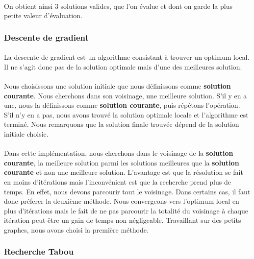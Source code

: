 \documentclass[12pt]{article}
\begin{document}
\paragraph{}On obtient ainsi 3 solutions valides, que l'on évalue et dont on garde la plus petite valeur d'évaluation.

\subsubsection{Descente de gradient}

\paragraph{}La descente de gradient est un algorithme consistant à trouver un optimum local.
Il ne s'agit donc pas de la solution optimale mais d'une des meilleures solution.

\paragraph{}Nous choisissons une solution initiale que nous définissons comme \textbf{solution courante}. Nous cherchons dans son voisinage, une meilleure solution.
S'il y en a une, nous la définissons comme \textbf{solution courante}, puis répétons l'opération.
S'il n'y en a pas, nous avons trouvé la solution optimale locale et l'algorithme est terminé.
Nous remarquons que la solution finale trouvée dépend de la solution initiale choisie.


\paragraph{}Dans cette implémentation, nous cherchons dans le voisinage de la \textbf{solution courante}, la meilleure solution parmi les solutions meilleures que la \textbf{solution courante} et non une meilleure solution.
L'avantage est que la résolution se fait en moins d'itérations mais l'inconvénient est que la recherche prend plus de temps. En effet, nous devons parcourir tout le voisinage.
Dans certains cas, il faut donc préferer la deuxième méthode. 
Nous convergeons vers l'optimum local en plus d'itérations mais le fait de ne pas parcourir la totalité du voisinage à chaque itération peut-être un gain de temps non négligeable.
Travaillant sur des petits graphes, nous avons choisi la première méthode.

\subsubsection{Recherche Tabou}
\end{document}
